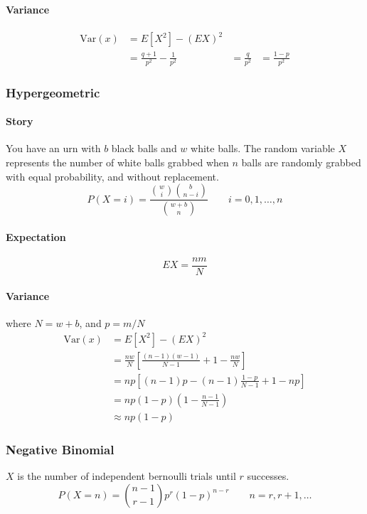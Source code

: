 \paragraph{Variance}
    \begin{equation*}
    \begin{aligned}
        \text{Var}(x) &= E[X^2] - (EX)^2 \\
                      &= \frac{q+1}{p^2}-\frac{1}{p^2} 
                      &= \frac{q}{p^2}
                      &=\frac{1-p}{p^2}
    \end{aligned}
    \end{equation*}

\subsubsection{Hypergeometric}
\paragraph{Story}
You have an urn with $b$ black balls and $w$ white balls. The random variable $X$ represents the number of white balls grabbed when $n$ balls are randomly grabbed with equal probability, and without replacement.
$$P(X=i) = \frac{\binom{w}{i}\binom{b}{n-i}}{\binom{w+b}{n}} \qquad i=0,1,\dots,n $$

\paragraph{Expectation}
$$EX = \frac{nm}{N}$$

\paragraph{Variance} where $N=w+b$, and $p=m/N$
    \begin{equation*}
    \begin{aligned}
        \text{Var}(x) &= E[X^2] - (EX)^2 \\
                      &= \frac{nw}{N}[\frac{(n-1)(w-1)}{N-1}+1-\frac{nw}{N}] \\
                      &= np[(n-1)p-(n-1)\frac{1-p}{N-1}+1-np] \\
                      &= np(1-p)(1-\frac{n-1}{N-1}) \\
                      &\approx np(1-p) 
    \end{aligned}
    \end{equation*}

\subsubsection{Negative Binomial}
$X$ is the number of independent bernoulli trials until $r$ successes.
$$P(X=n) = \binom{n-1}{r-1}p^r(1-p)^{n-r} \qquad n=r,r+1,\dots$$

